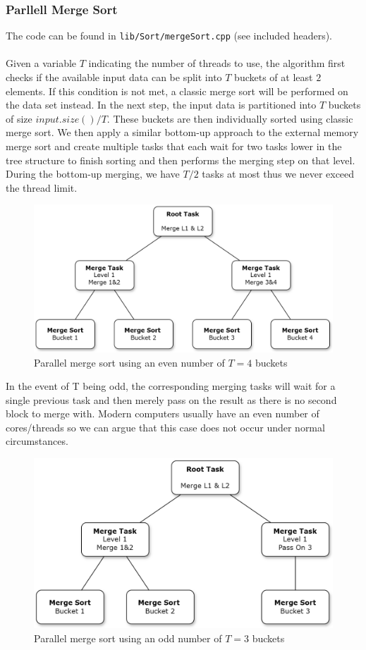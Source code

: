 \documentclass[twocolumn]{article}
\begin{document}
\subsubsection{Parllell Merge Sort}
The code can be found in \texttt{lib/Sort/mergeSort.cpp} (see included headers).\\
\\
Given a variable $T$ indicating the number of threads to use, the algorithm first checks if the available input data can be split into $T$ buckets of at least $2$ elements. 
If this condition is not met, a classic merge sort will be performed on the data set instead.
In the next step, the input data is partitioned into $T$ buckets of size $input.size()/T$.  
These buckets are then individually sorted using classic merge sort. 
We then apply a similar bottom-up approach to the external memory merge sort and create multiple tasks that each wait for two tasks lower in the tree structure to finish sorting and then performs the merging step on that level. 
During the bottom-up merging, we have $T/2$ tasks at most thus we never exceed the thread limit.
\begin{figure}[h]
    \includegraphics[scale=0.175]{./figures/merge_sort_even.png}
    \centering
    \caption{Parallel merge sort using an even number of $T=4$ buckets}
    \end{figure}
In the event of T being odd, the corresponding merging tasks will wait for a single previous task and then merely pass on the result as there is no second block to merge with. 
Modern computers usually have an even number of cores/threads so we can argue that this case does not occur under normal circumstances.
\begin{figure}[h]
\includegraphics[scale=0.175]{./figures/merge_sort_odd.png}
\centering
\caption{Parallel merge sort using an odd number of $T=3$ buckets}
\end{figure}
\end{document}
